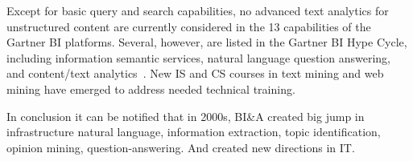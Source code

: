 Except for basic query and search capabilities, no advanced
text analytics for unstructured content are currently considered in the 13 capabilities of the Gartner BI platforms.
Several, however, are listed in the Gartner BI Hype Cycle,
including information semantic services, natural language
question answering, and content/text analytics~\cite{Blei:2012}. 
New IS and CS courses in text mining and web mining have
emerged to address needed technical training.

In conclusion it can be notified that in 2000s, BI\&A created big jump in infrastructure natural language, information extraction, topic identification, opinion mining, question-answering. And created new directions in IT.
